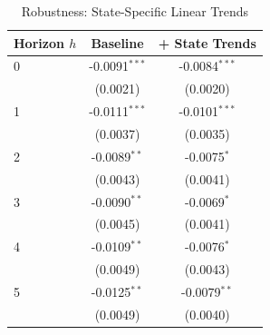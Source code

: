 \begin{table}[htbp]
\centering
\caption{Robustness: State-Specific Linear Trends}
\label{tab:trends}
\begin{tabular}{lcc}
\hline\hline
Horizon $h$ & Baseline & + State Trends \\
\hline
0 & -0.0091$^{***}$ & -0.0084$^{***}$ \\
 & (0.0021) & (0.0020) \\[3pt]
1 & -0.0111$^{***}$ & -0.0101$^{***}$ \\
 & (0.0037) & (0.0035) \\[3pt]
2 & -0.0089$^{**}$ & -0.0075$^{*}$ \\
 & (0.0043) & (0.0041) \\[3pt]
3 & -0.0090$^{**}$ & -0.0069$^{*}$ \\
 & (0.0045) & (0.0041) \\[3pt]
4 & -0.0109$^{**}$ & -0.0076$^{*}$ \\
 & (0.0049) & (0.0043) \\[3pt]
5 & -0.0125$^{**}$ & -0.0079$^{**}$ \\
 & (0.0049) & (0.0040) \\[3pt]
\hline\hline
\end{tabular}
\end{table}